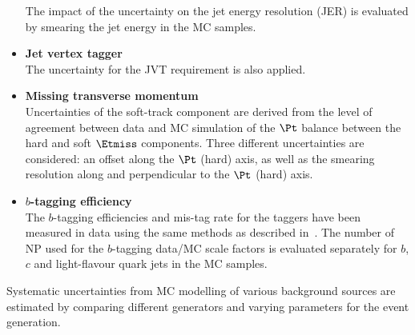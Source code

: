 \begin{itemize}
	The impact of the uncertainty on the jet energy resolution (JER) is
	evaluated by smearing the jet energy in the MC samples. 
	\item \textbf{Jet vertex tagger} \\ 
	The uncertainty for the JVT requirement is also applied. 	
	\item \textbf{Missing transverse momentum} \\ 
	Uncertainties of the soft-track component are derived from the level
	of agreement between data and MC simulation of the $\Pt$ balance
	between the hard and soft $\Etmiss$ components. Three different
	uncertainties are considered: an offset along the $\Pt$ (hard) axis,
	as well as the smearing resolution along and perpendicular to the
	$\Pt$ (hard) axis.
	\item \textbf{$b$-tagging efficiency} \\ 
	The $b$-tagging efficiencies and mis-tag rate for the taggers have
	been measured in data using the same methods as described
	in~\cite{ATLAS-CONF-2014-046,ATLAS-CONF-2014-004}. The number of NP
	used for the $b$-tagging data/MC scale factors is evaluated
	separately for $b$, $c$ and light-flavour quark jets in the MC
	samples.\\	
\end{itemize}

\noindent Systematic uncertainties from MC modelling of various background sources are estimated by comparing
different generators and varying parameters for the event generation.

